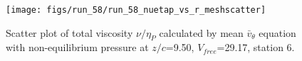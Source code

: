 \begin{figure}[H]
\centering
\texttt{[image: figs/run\_58/run\_58\_nuetap\_vs\_r\_meshscatter]}
\caption{Scatter plot of total viscosity $\nu / \eta_P$ calculated by mean $\bar{v}_{\theta}$ equation with non-equilibrium pressure at $z/c$=9.50, $V_{free}$=29.17, station 6.}
\label{fig:run_58_nuetap_vs_r_meshscatter}
\end{figure}


